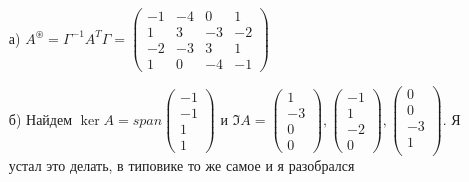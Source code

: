 \begin{enumerate}
    \item[а)] $A^\circledast = \Gamma^{-1}A^T \Gamma = \begin{pmatrix}
        -1 & -4 & 0 & 1\\
        1 &3 & -3 & -2\\
        -2 & -3 &3 &1\\
        1 & 0  & -4 &-1
    \end{pmatrix}$
    \item[б)] Найдем $\ker A = span\begin{pmatrix}
        -1\\
        -1\\1
        \\1
    \end{pmatrix}$ и $\Im A = \begin{pmatrix}
        1\\
        -3\\0
        \\0
    \end{pmatrix}, \begin{pmatrix}
        -1 \\
        1\\-2\\
        0
    \end{pmatrix}, \begin{pmatrix}
        0\\
        0\\
        -3\\
        1\\
    \end{pmatrix}$. Я устал это делать, в типовике то же самое и я разобрался
\end{enumerate}